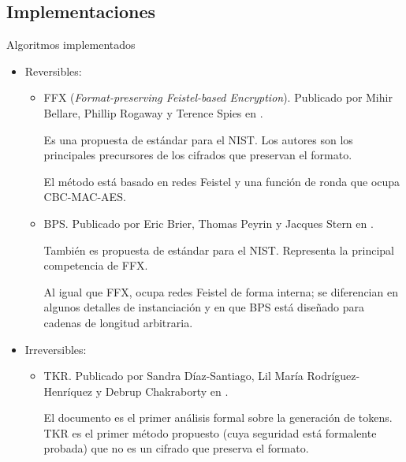 %
%
%

\subsection{Implementaciones}

\begin{frame}{Algoritmos implementados}

  \begin{itemize}
    \item<1-> Reversibles:
      \begin{itemize}

        \item<2-> FFX (\textit{Format-preserving Feistel-based Encryption}).
          Publicado por Mihir Bellare, Phillip Rogaway y Terence Spies en
          \cite{ffx_1}.

          {
            Es una propuesta de estándar para el NIST. Los autores son los
            principales precursores de los cifrados que preservan el
            formato.

            El método está basado en redes Feistel y una función de ronda
            que ocupa CBC-MAC-AES.
          }

        \item<3-> BPS. Publicado por Eric Brier, Thomas Peyrin y Jacques
          Stern en \cite{bps}.

          {
            También es propuesta de estándar para el NIST. Representa la
            principal competencia de FFX.

            Al igual que FFX, ocupa redes Feistel de forma interna; se
            diferencian en algunos detalles de instanciación y en que
            BPS está diseñado para cadenas de longitud arbitraria.
          }

      \end{itemize}
    \item<4-> Irreversibles:
      \begin{itemize}

        \item<5-> TKR. Publicado por Sandra Díaz-Santiago, Lil María
          Rodríguez-Henríquez y Debrup Chakraborty en \cite{doc_sandra}.

          {
            El documento es el primer análisis formal sobre la generación de
            tokens. TKR es el primer método propuesto (cuya seguridad está
            formalente probada) que no es un cifrado que preserva el formato.
          }


\end{itemize}
\end{itemize}
\end{frame}
